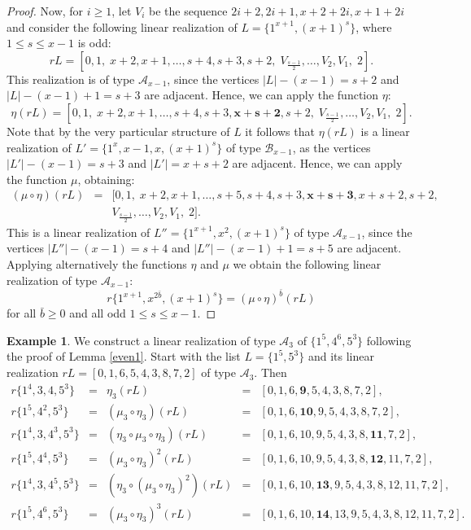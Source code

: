 \documentclass{amsart}
\theoremstyle{definition}
\newtheorem{ex}[prop]{Example}
\numberwithin{equation}{section}
\def\A{\mathcal{A}}
\def\B{\mathcal{B}}
\begin{document}
\begin{proof}
Now, for $i\geq 1$, let $V_i$ be the sequence $2i+2, 2i+1, x+2+2i, x+1+2i$ and  consider the following linear
realization of $L=\{1^{x+1}, (x+1)^s\}$, where $1\leq s\leq x-1$ is odd:
$$rL=[0,1,\; x+2,x+1,\ldots,s+4,s+3,s+2,\;  V_{\frac{s-1}{2}}, \ldots,V_2,V_1,\; 2].$$
This realization is  of type $\A_{x-1}$, since the vertices $|L|-(x-1) = s+2$ and $|L|-(x-1) + 1=s+3$ are adjacent. Hence, we
can apply the function $\eta$:
$$\eta(rL) = [0,1,\; x+2,x+1,\ldots,s+4,s+3,\bm{x+s+2}, s+2,\;  V_{\frac{s-1}{2}}, \ldots,V_2,V_1,\; 2  ].$$
Note that by the very particular structure of $L$ it follows that $\eta(rL)$ is a linear realization
 of $L'=\{1^{x}, x-1, x, (x+1)^s\}$ of type $\B_{x-1}$, as the vertices $|L'|-(x-1)=s+3$ and
$|L'|=x+s+2$ are adjacent.
Hence, we can apply the function $\mu$, obtaining:
$$\begin{array}{rcl}
(\mu\circ\eta)(rL) &= & [0,1,\; x+2,x+1,\ldots,s+5,s+4,s+3,\bm{x+s+3},x+s+2, s+2,\\
&& V_{\frac{s-1}{2}}, \ldots,V_2,V_1,\; 2 ].
\end{array}$$
This is a linear realization  of $L''=\{1^{x+1}, x^{2}, (x+1)^s\}$ of type $\A_{x-1}$, since
the vertices $|L''|-(x-1)=s+4$ and $|L''|-(x-1)+1=s+5$ are adjacent.
Applying alternatively the functions $\eta$ and $\mu$ we obtain the following linear realization of type $\A_{x-1}$:
$$r\{1^{x+1}, x^{2\bar b}, (x+1)^{s} \}=(\mu \circ \eta)^{\bar b} (rL)$$
for all $\bar b\geq 0$ and all odd $1\leq s\leq x-1$.
\end{proof}

\begin{ex}
We construct a  linear realization of  type $\A_3$ of $\{1^{5},4^6,5^3\}$
following the proof of Lemma \ref{even1}.
Start with the list $L=\{1^5,5^3\}$ and its linear realization
$rL=[0,1,6,5,4,3,8,7,2]$  of type $\A_3$. Then
$$\begin{array}{rcccl}
r\{1^4,3,4,5^3\} & = & \eta_3(rL) & =& [0,1,6,\bm{9},5,4,3,8,7,2], \\
r\{1^5,4^2,5^3\} & = & (\mu_3\circ\eta_3)(rL) & =& [0,1,6,\bm{10},9,5,4,3,8,7,2], \\
r\{1^4,3,4^3,5^3\} & = & (\eta_3\circ \mu_3\circ \eta_3)(rL) & =& [0,1,6,10,9,5,4,3,8,\bm{11},7,2], \\
r\{1^5,4^4,5^3\} & = & (\mu_3\circ\eta_3)^2(rL) & =& [0,1,6,10,9,5,4,3,8,\bm{12},11,7,2], \\
r\{1^4,3,4^5,5^3\} & = & (\eta_3\circ(\mu_3\circ\eta_3)^2)(rL) & =& [0,1,6,10,\bm{13},9,5,4,3,8,12,11,7,2], \\
r\{1^5,4^6,5^3\} & = & (\mu_3\circ\eta_3)^3(rL) & =& [0,1,6,10,\bm{14},13,9,5,4,3,8,12,11,7,2].
\end{array}$$
\end{ex}
\end{document}
